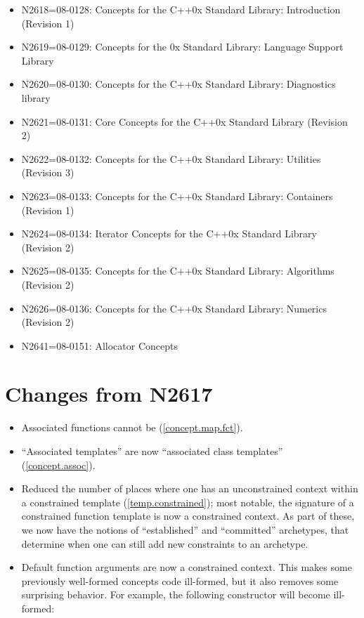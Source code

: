 \documentclass[american]{book}
\begin{document}
\begin{titlepage}
\begin{itemize}
\item N2618=08-0128: Concepts for the C++0x Standard Library: Introduction (Revision 1)
\item N2619=08-0129: Concepts for the \Cpp{}0x Standard Library:
  Language Support Library
\item N2620=08-0130: Concepts for the C++0x Standard Library:
  Diagnostics library
\item N2621=08-0131: Core Concepts for the C++0x Standard Library
  (Revision 2)
\item N2622=08-0132: Concepts for the C++0x Standard Library:
  Utilities (Revision 3)
\item N2623=08-0133: Concepts for the C++0x Standard Library:
  Containers (Revision 1)
\item N2624=08-0134: Iterator Concepts for the C++0x Standard Library
  (Revision 2)
\item N2625=08-0135: Concepts for the C++0x Standard Library:
  Algorithms (Revision 2)
\item N2626=08-0136: Concepts for the C++0x Standard Library: Numerics
  (Revision 2)
\item N2641=08-0151: Allocator Concepts
\end{itemize}

\section*{Changes from N2617}
\begin{itemize}
\item Associated functions cannot be 
  (\ref{concept.map.fct}).
\item ``Associated templates'' are now ``associated class templates'' (\ref{concept.assoc}).
\item Reduced the number of places where one has an unconstrained
  context within a constrained template
  (\mbox{\ref{temp.constrained}}); most notable, the signature of a
  constrained function template is now a constrained context. As part
  of these, we now have the notions of ``established'' and
  ``committed'' archetypes, that determine when one can still add new
  constraints to an archetype.
\item Default function arguments are now a constrained context. This
  makes some previously well-formed concepts code ill-formed, but it
  also removes some surprising behavior. For example, the following
  constructor will become ill-formed:


\end{itemize}
\end{titlepage}
\end{document}
